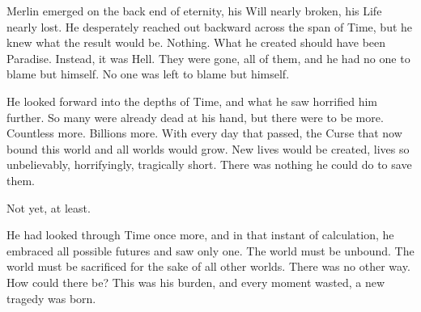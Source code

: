 
Merlin emerged on the back end of eternity, his Will nearly broken, his Life nearly lost. He desperately reached out backward across the span of Time, but he knew what the result would be. Nothing. What he created should have been Paradise. Instead, it was Hell. They were gone, all of them, and he had no one to blame but himself. No one was left to blame but himself.

He looked forward into the depths of Time, and what he saw horrified him further. So many were already dead at his hand, but there were to be more. Countless more. Billions more. With every day that passed, the Curse that now bound this world and all worlds would grow. New lives would be created, lives so unbelievably, horrifyingly, tragically short. There was nothing he could do to save them.

Not yet, at least.

He had looked through Time once more, and in that instant of calculation, he embraced all possible futures and saw only one. The world must be unbound. The world must be sacrificed for the sake of all other worlds. There was no other way. How could there be? This was his burden, and every moment wasted, a new tragedy was born.
